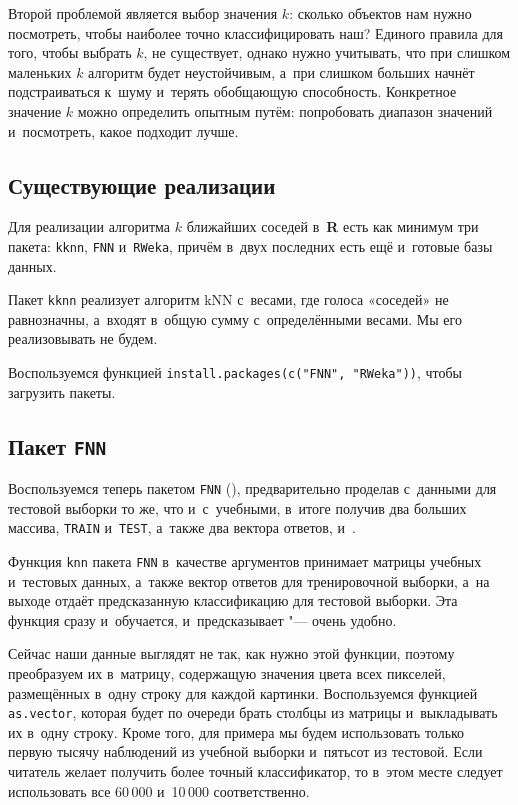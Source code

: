\documentclass[final,pdftex]{../../template/epsilonj}\usepackage[]{graphicx}\usepackage[]{color}
\begin{document}
Второй проблемой является выбор значения $k$: сколько объектов нам нужно посмотреть, чтобы наиболее точно классифицировать наш? 
Единого правила для того, чтобы выбрать $k$, не существует, однако нужно учитывать, что при слишком маленьких $k$ алгоритм будет неустойчивым, а~при слишком больших начнёт подстраиваться к~шуму и~терять обобщающую способность. 
Конкретное значение $k$ можно определить опытным путём: попробовать диапазон значений и~посмотреть, какое подходит лучше.

\subsection{Существующие реализации}

Для реализации алгоритма $k$ ближайших соседей в~\textbf{R} есть как минимум три пакета: \texttt{kknn}, \texttt{FNN} и~\texttt{RWeka}, причём в~двух последних есть ещё и~готовые базы данных.

Пакет \texttt{kknn} реализует алгоритм kNN с~весами, где голоса «соседей» не равнозначны, а~входят в~общую сумму с~определёнными весами. Мы его реализовывать не будем.

Воспользуемся функцией \texttt{install.packages(c("FNN", "RWeka"))}, чтобы загрузить пакеты.

\subsection{Пакет \texttt{FNN}}

Воспользуемся теперь пакетом \texttt{FNN} (\cite{RFNNpackage14}), предварительно проделав с~данными для тестовой выборки то же, что и~с~учебными, в~итоге получив два больших массива, \texttt{TRAIN} и~\texttt{TEST}, а~также два вектора ответов,  и~. 



Функция \texttt{knn} пакета \texttt{FNN} в~качестве аргументов принимает матрицы учебных и~тестовых данных, а~также вектор ответов для тренировочной выборки, а~на выходе отдаёт предсказанную классификацию для тестовой выборки. 
Эта функция сразу и~обучается, и~предсказывает "--- очень удобно.

Сейчас наши данные выглядят не так, как нужно этой функции, поэтому преобразуем их в~матрицу, содержащую значения цвета всех пикселей, размещённых в~одну строку для каждой картинки. 
Воспользуемся функцией \texttt{as.vector}, которая будет по очереди брать столбцы из матрицы и~выкладывать их в~одну строку. 
Кроме того, для примера мы будем использовать только первую тысячу наблюдений из учебной выборки и~пятьсот из тестовой. 
Если читатель желает получить более точный классификатор, то в~этом месте следует использовать все 60\,000 и~10\,000 соответственно.
\end{document}
